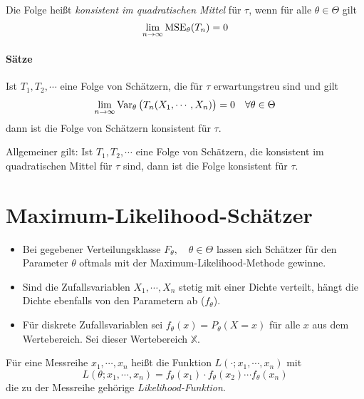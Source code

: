             Die Folge heißt \textit{konsistent im quadratischen Mittel} für \(\tau\), wenn für alle \(\theta \in \Theta\) gilt
            \begin{equation*}
                \lim\limits_{n \rightarrow \infty} \operatorname{MSE}_\theta(T_n) = 0
            \end{equation*}
            
            \paragraph{Sätze}
                Ist \(T_1, T_2, \cdots\) eine Folge von Schätzern, die für \(\tau\) erwartungstreu sind und gilt
                \begin{equation*}
	                \lim\limits_{n \rightarrow \infty} \operatorname{Var}_\theta\big(T_n(X_1, \cdots, X_n)\big) = 0 \quad \forall \theta \in \Theta
                \end{equation*}
                dann ist die Folge von Schätzern konsistent für \(\tau\).
                
                Allgemeiner gilt: Ist \( T_1, T_2, \cdots \) eine Folge von Schätzern, die konsistent im quadratischen Mittel für \(\tau\) sind, dann ist die Folge konsistent für \(\tau\).

    \section{Maximum-Likelihood-Schätzer}
        \begin{itemize}
        	\item Bei gegebener Verteilungsklasse \( F_\theta, \quad \theta \in \Theta \) lassen sich Schätzer für den Parameter \(\theta\) oftmals mit der Maximum-Likelihood-Methode gewinne.
        	\item Sind die Zufallsvariablen \( X_1, \cdots, X_n \) stetig mit einer Dichte verteilt, hängt die Dichte ebenfalls von den Parametern ab (\(f_\theta\)).
        	\item Für diskrete Zufallsvariablen sei \( f_\theta(x) = P_\theta(X = x) \) für alle \(x\) aus dem Wertebereich. Sei dieser Wertebereich \(\mathbb{X}\).
        \end{itemize}
    
		Für eine Messreihe \( x_1, \cdots, x_n \) heißt die Funktion \( L(\cdot; x_1, \cdots, x_n) \) mit
		\begin{equation*}
			L(\theta; x_1, \cdots, x_n) = f_\theta(x_1) \cdot f_\theta(x_2) \cdots f_\theta(x_n)
		\end{equation*}
		die zu der Messreihe gehörige \textit{Likelihood-Funktion}.
		
